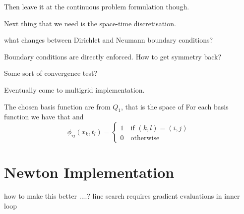 \documentclass[../draft_1.tex]{subfiles}
\begin{document}

Then leave it at the continuous problem formulation though.

Next thing that we need is the space-time discretisation. 

what changes between Dirichlet and Neumann boundary conditions? 

Boundary conditions are directly enforced. How to get symmetry back? 

Some sort of convergence test? 

Eventually come to multigrid implementation. 

The chosen basis function are from $Q_1$, that is the space of 
For each basis function we have that  and  
\begin{equation}
\phi_{ij}(x_k, t_l) = \begin{cases} 1 \quad \text{if } (k,l) = (i,j)  \\ 0 \quad \text{otherwise} \end{cases}
\end{equation}

\section{Newton Implementation}

how to make this better ....? line search requires gradient evaluations in inner loop
\end{document}
